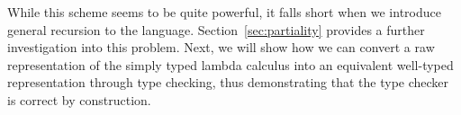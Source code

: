 While this scheme seems to be quite powerful, it falls short when we introduce general recursion to the language. Section~\ref{sec:partiality} provides a further investigation into this problem. Next, we will show how we can convert a raw representation of the simply typed lambda calculus into an equivalent well-typed representation through type checking, thus demonstrating that the type checker is correct by construction.

